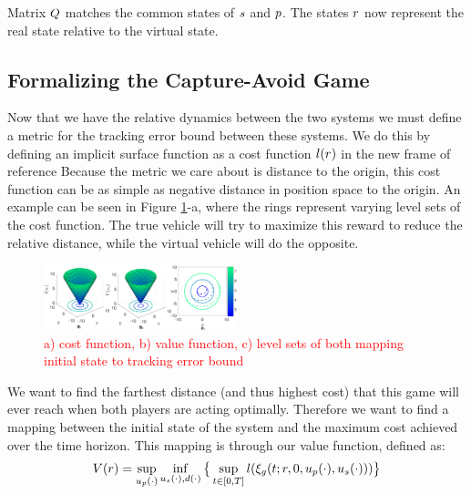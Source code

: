 Matrix $Q$ matches the common states of $s$ and $p$. The states $r$ now represent the real state relative to the virtual state.

\subsection{Formalizing the Capture-Avoid Game}
Now that we have the relative dynamics between the two systems we must define a metric for the tracking error bound between these systems. We do this by defining an implicit surface function as a cost function $l(r)$ in the new frame of reference  Because the metric we care about is distance to the origin, this cost function can be as simple as negative distance in position space to the origin. An example can be seen in Figure \ref{fig:quad4D_example}-a, where the rings represent varying level sets of the cost function. The true vehicle will try to maximize this reward to reduce the relative distance, while the virtual vehicle will do the opposite.

\begin{figure}
	\centering
	\includegraphics[width=0.5\textwidth]{fig/quad4D_example}
	\caption{\textcolor{red}{a) cost function, b) value function, c) level sets of both mapping initial state to tracking error bound}}
	\label{fig:quad4D_example}
\end{figure} 
 
 We want to find the farthest distance (and thus highest cost) that this game will ever reach when both players are acting optimally. Therefore we want to find a mapping between the initial state of the system and the maximum cost achieved over the time horizon. This mapping is through our value function, defined as: 
 \begin{equation}
 \begin{aligned}
 	V(r)= \sup_{u_p(\cdot)} \inf_{u_s(\cdot), d(\cdot)} \big\{\sup_{t\in [0, T]} l(\xi_g(t; r, 0, u_p(\cdot), u_s(\cdot)))\big\}
 	\end{aligned}
 \end{equation} 
 
